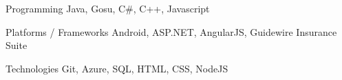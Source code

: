 

\begin{cvskills}

  \cvskill
    {Programming} %
    {Java, Gosu, C\#, C++, Javascript} %

  \cvskill
    {Platforms / Frameworks} %
    {Android, ASP.NET, AngularJS, Guidewire Insurance Suite} %

  \cvskill
    {Technologies} %
    {Git, Azure, SQL, HTML, CSS, NodeJS} %

\end{cvskills}
